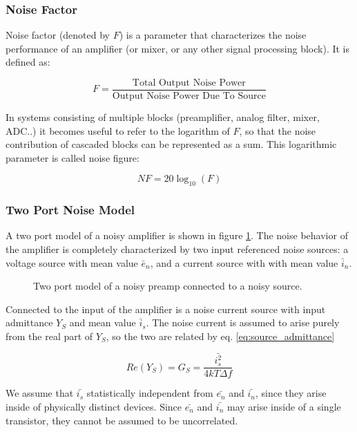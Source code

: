 \subsubsection{Noise Factor}
Noise factor (denoted by $F$) is a parameter that characterizes the noise performance of an amplifier (or mixer, or any other signal
processing block).  It is defined as:

\begin{equation}\label{eq:noise_factor}
    F = \frac{\text{Total Output Noise Power}}{\text{Output Noise Power Due To Source}}
\end{equation}

In systems consisting of multiple blocks (preamplifier, analog filter, mixer, ADC..) it becomes useful to refer to the
logarithm of $F$, so that the noise contribution of cascaded blocks can be represented as a sum. This logarithmic
parameter is called noise figure:

\begin{equation}\label{eq:noise_figure}
    NF = 20 \log_{10}(F)
\end{equation}

\subsubsection{Two Port Noise Model}

A two port model of a noisy amplifier is shown in figure \ref{fig:2port_noise}. The noise behavior of the amplifier is
completely characterized by two input referenced noise sources: a voltage source with mean value $\bar{e}_n$, and a
current source with with mean value $\bar{i}_n$.

\begin{figure}
    \centering
    
    \caption{Two port model of a noisy preamp connected to a noisy source.}
    \label{fig:2port_noise}
\end{figure}

Connected to the input of the amplifier is a noise current source with input admittance $Y_S$ and mean value
$\bar{i}_s$. The noise current is assumed to arise purely from the real part of $Y_S$, so the two are related by eq.
\ref{eq:source_admittance}

\begin{equation}\label{eq:source_admittance}
    Re(Y_S) = G_S = \frac{\bar{i_s^2}}{4kT\Delta f}
\end{equation}

We assume that $\bar{i_s}$ statistically independent from $\bar{e_n}$ and $\bar{i_n}$, since they arise inside of
physically distinct devices. Since $\bar{e_n}$ and $\bar{i_n}$ may arise inside of a single transistor, they cannot be
assumed to be uncorrelated.

